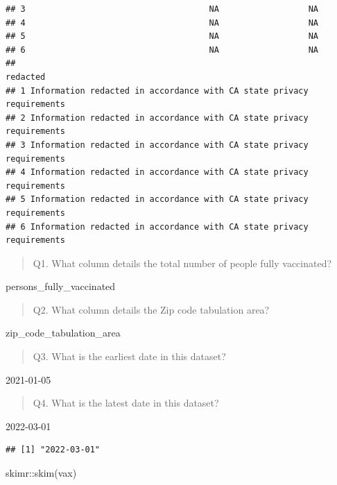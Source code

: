 \documentclass[
]{article}
\newenvironment{Shaded}{\begin{snugshade}}{\end{snugshade}}
\newcommand{\FunctionTok}[1]{\textcolor[rgb]{0.00,0.00,0.00}{#1}}
\newcommand{\NormalTok}[1]{#1}
\newcommand{\SpecialCharTok}[1]{\textcolor[rgb]{0.00,0.00,0.00}{#1}}
\begin{document}
\begin{verbatim}
## 3                                     NA                  NA
## 4                                     NA                  NA
## 5                                     NA                  NA
## 6                                     NA                  NA
##                                                                redacted
## 1 Information redacted in accordance with CA state privacy requirements
## 2 Information redacted in accordance with CA state privacy requirements
## 3 Information redacted in accordance with CA state privacy requirements
## 4 Information redacted in accordance with CA state privacy requirements
## 5 Information redacted in accordance with CA state privacy requirements
## 6 Information redacted in accordance with CA state privacy requirements
\end{verbatim}

\begin{quote}
Q1. What column details the total number of people fully vaccinated?
\end{quote}

persons\_fully\_vaccinated

\begin{quote}
Q2. What column details the Zip code tabulation area?
\end{quote}

zip\_code\_tabulation\_area

\begin{quote}
Q3. What is the earliest date in this dataset?
\end{quote}

2021-01-05

\begin{quote}
Q4. What is the latest date in this dataset?
\end{quote}

2022-03-01

\begin{Shaded}
\end{Shaded}

\begin{verbatim}
## [1] "2022-03-01"
\end{verbatim}

\begin{Shaded}
\begin{Highlighting}[]
\NormalTok{skimr}\SpecialCharTok{::}\FunctionTok{skim}\NormalTok{(vax)}
\end{Highlighting}
\end{Shaded}
\end{document}
